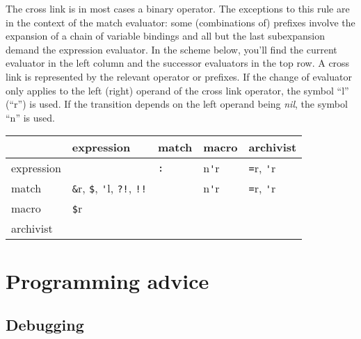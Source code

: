 \documentclass[12pt]{article}
\begin{document}
The cross link is in most cases a binary operator. The exceptions to
this rule are in the context of the match evaluator: some
(combinations of) prefixes involve the expansion of a chain of
variable bindings and all but the last subexpansion demand the
expression evaluator. In the scheme below, you'll find the current
evaluator in the left column and the successor evaluators in the top
row. A cross link is represented by the relevant operator or
prefixes. If the change of evaluator only applies to the left (right)
operand of the cross link operator, the symbol ``l'' (``r'') is
used. If the transition depends on the left operand being \emph{nil},
the symbol ``n'' is used.
\begin{center}
  \begin{tabular}{lllll}
    \toprule
    & expression & match & macro & archivist \\
    \midrule
  expression & & \verb|:| & n\verb|'|r & \verb|=|r, \verb|'|r\\
  match & \verb|&|r, \verb|$|, \verb|'|l, \verb|?!|, \verb|!!| & & n\verb|'|r & \verb|=|r, \verb|'|r\\
  macro & \verb|$|r \\
    archivist \\
    \bottomrule
\end{tabular}
\end{center}

\section{Programming advice}

\subsection{Debugging}
\end{document}
